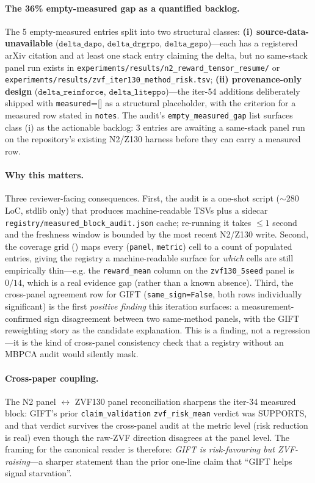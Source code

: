 \paragraph{The 36\% empty-measured gap as a quantified backlog.}
The 5 empty-measured entries split into two structural classes:
\textbf{(i) source-data-unavailable} ($\texttt{delta\_dapo}$,
$\texttt{delta\_drgrpo}$, $\texttt{delta\_gspo}$)---each has a
registered arXiv citation and at least one stack entry claiming the
delta, but no same-stack panel run exists in
\texttt{experiments/results/n2\_reward\_tensor\_resume/} or
\texttt{experiments/results/zvf\_iter130\_method\_risk.tsv};
\textbf{(ii) provenance-only design} ($\texttt{delta\_reinforce}$,
$\texttt{delta\_liteppo}$)---the iter-54 additions deliberately
shipped with \texttt{measured}=[] as a structural placeholder, with
the criterion for a measured row stated in \texttt{notes}. The
audit's \texttt{empty\_measured\_gap} list surfaces class (i) as
the actionable backlog: 3 entries are awaiting a same-stack panel run
on the repository's existing N2/Z130 harness before they can carry a
measured row.

\paragraph{Why this matters.} Three reviewer-facing consequences.
First, the audit is a one-shot script ($\sim$280\,LoC, stdlib only)
that produces machine-readable TSVs plus a sidecar
\texttt{registry/measured\_block\_audit.json} cache; re-running it
takes $\leq 1$ second and the freshness window is bounded by the most
recent N2/Z130 write. Second, the coverage grid
() maps every (\texttt{panel},
\texttt{metric}) cell to a count of populated entries, giving the
registry a machine-readable surface for \emph{which} cells are still
empirically thin---e.g. the \texttt{reward\_mean} column on the
\texttt{zvf130\_5seed} panel is $0/14$, which is a real evidence gap
(rather than a known absence). Third, the cross-panel agreement row
for GIFT (\texttt{same\_sign=False}, both rows individually significant)
is the first \emph{positive finding} this iteration surfaces: a
measurement-confirmed sign disagreement between two same-method
panels, with the GIFT reweighting story as the candidate
explanation. This is a finding, not a regression---it is the kind
of cross-panel consistency check that a registry without an MBPCA
audit would silently mask.

\paragraph{Cross-paper coupling.}
The N2 panel ${}\leftrightarrow{}$ ZVF130 panel reconciliation
sharpens the iter-34 measured block: GIFT's prior
\texttt{claim\_validation} \texttt{zvf\_risk\_mean} verdict was
SUPPORTS, and that verdict survives the cross-panel audit at the
metric level (risk reduction is real) even though the raw-ZVF
direction disagrees at the panel level. The framing for the
canonical reader is therefore: \emph{GIFT is risk-favouring but
ZVF-raising}---a sharper statement than the prior one-line claim
that ``GIFT helps signal starvation''.


